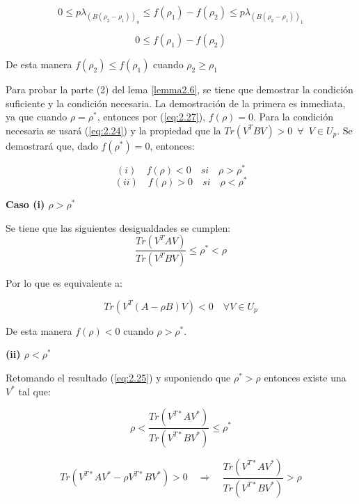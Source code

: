 \begin{equation*}
	0 \leq p \lambda_{(B (\rho_2 - \rho_1))_n} \leq f(\rho_1) - f(\rho_2) \leq  p \lambda_{(B (\rho_2 - \rho_1))_1}
\end{equation*}
	
\begin{equation}\label{eq:2.35}
	0 \leq f(\rho_1) - f(\rho_2)
\end{equation}

De esta manera $f(\rho_2)  \leq  f(\rho_1) $ cuando $\rho_2 \geq \rho_1$

Para probar la parte (2) del lema \ref{lemma2.6}, se tiene que demostrar la condición suficiente y la condición necesaria. La demostración de la primera es inmediata, ya que cuando $\rho = \rho^*$, entonces por (\ref{eq:2.27}), $f(\rho) = 0$. Para la condición necesaria se usará (\ref{eq:2.24}) y la propiedad que la $Tr(V^T B V) >0 \enspace \forall \enspace V \in U_p$. Se demostrará que, dado $f(\rho^*) = 0$, entonces:


\begin{equation}\label{eq:2.36}
	(i) \quad f(\rho) < 0 \quad si \quad \rho>\rho^*
\end{equation}
\begin{equation}\label{eq:2.37}
	(ii) \quad f(\rho) > 0 \quad si \quad \rho<\rho^*
\end{equation}

\textbf{Caso (i) $\rho > \rho^* $}

Se tiene que las siguientes desigualdades se cumplen:
\begin{equation*}
\frac{Tr(V^T A V)}{Tr(V^T B V)} \leq \rho^* < \rho	
\end{equation*}

Por lo que es equivalente a:

\begin{equation*}
	Tr(V^T (A -\rho B)V) < 0 \quad \forall V \in U_p
\end{equation*}


De esta manera $f(\rho) < 0$ cuando $\rho > \rho^*$.

\textbf{(ii) $\rho < \rho^* $}

Retomando el resultado (\ref{eq:2.25}) y suponiendo que $\rho^* > \rho$ entonces existe una $V^{*}$ tal que:


 \begin{equation*} 
 \rho < \frac{Tr(V^{T*} A V^*)}{Tr(V^{T*} B V^*)} \leq \rho^*
 \end{equation*}

\begin{equation*}
Tr(V^{T*} A V^* - \rho V^{T*} B V^*) > 0 \quad \Longrightarrow \quad \frac{Tr(V^{T*} A V^*)}{Tr(V^{T*} B V^{*})} > \rho
\end{equation*}

